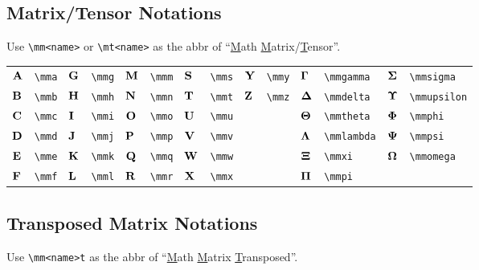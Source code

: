 \documentclass{article}
\begin{document}
\subsection{Matrix/Tensor Notations}
Use \lstinline`\mm<name>` or \lstinline`\mt<name>` as the abbr of ``\underline{M}ath \underline{M}atrix/\underline{T}ensor''.

\begin{tabular}{*{14}{l}}
    ${\mathbf A}$ & \lstinline`\mma`  & ${\mathbf G}$ & \lstinline`\mmg`  & ${\mathbf M}$ & \lstinline`\mmm`  & ${\mathbf S}$ & \lstinline`\mms`  & ${\mathbf Y}$ & \lstinline`\mmy` & ${\bm \Gamma}$  & \lstinline`\mmgamma`  & ${\bm \Sigma}$   & \lstinline`\mmsigma`  \\
    ${\mathbf B}$ & \lstinline`\mmb`  & ${\mathbf H}$ & \lstinline`\mmh`  & ${\mathbf N}$ & \lstinline`\mmn`  & ${\mathbf T}$ & \lstinline`\mmt`  & ${\mathbf Z}$ & \lstinline`\mmz` & ${\bm \Delta}$  & \lstinline`\mmdelta`  & ${\bm \Upsilon}$ & \lstinline`\mmupsilon`  \\
    ${\mathbf C}$ & \lstinline`\mmc`  & ${\mathbf I}$ & \lstinline`\mmi`  & ${\mathbf O}$ & \lstinline`\mmo`  & ${\mathbf U}$ & \lstinline`\mmu`  &        &                         & ${\bm \Theta}$  & \lstinline`\mmtheta`  & ${\bm \Phi}$     & \lstinline`\mmphi`  \\
    ${\mathbf D}$ & \lstinline`\mmd`  & ${\mathbf J}$ & \lstinline`\mmj`  & ${\mathbf P}$ & \lstinline`\mmp` & ${\mathbf V}$ & \lstinline`\mmv` &        &                         & ${\bm \Lambda}$ & \lstinline`\mmlambda` & ${\bm \Psi}$     & \lstinline`\mmpsi` \\
    ${\mathbf E}$ & \lstinline`\mme` & ${\mathbf K}$ & \lstinline`\mmk` & ${\mathbf Q}$ & \lstinline`\mmq` & ${\mathbf W}$ & \lstinline`\mmw` &        &                         & ${\bm \Xi}$     & \lstinline`\mmxi` & ${\bm \Omega}$   & \lstinline`\mmomega` \\
    ${\mathbf F}$ & \lstinline`\mmf` & ${\mathbf L}$ & \lstinline`\mml` & ${\mathbf R}$ & \lstinline`\mmr` & ${\mathbf X}$ & \lstinline`\mmx` &        &                         & ${\bm \Pi}$     & \lstinline`\mmpi` &                                         \\
\end{tabular}


\subsection{Transposed Matrix Notations}
Use \lstinline`\mm<name>t` as the abbr of ``\underline{M}ath \underline{M}atrix \underline{T}ransposed''.
\end{document}
